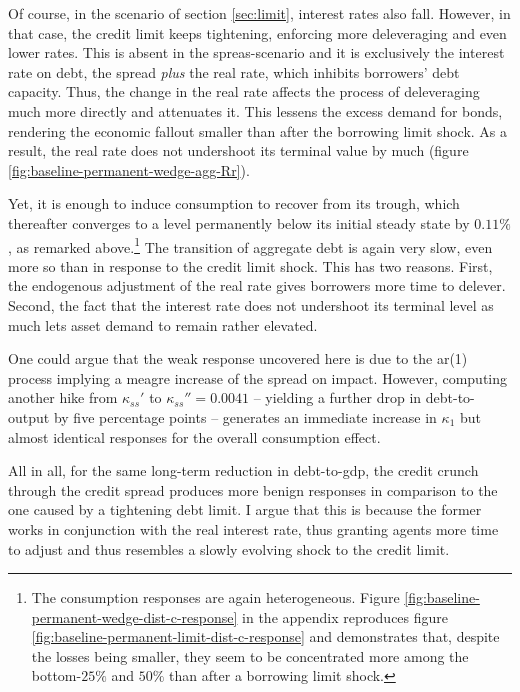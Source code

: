 \documentclass[a4paper,12pt]{article} %
\numberwithin{equation}{section} %
\numberwithin{figure}{section}
\numberwithin{table}{section}
\begin{document}
Of course, in the scenario of section \ref{sec:limit}, interest rates also fall. However, in that case, the credit limit keeps tightening, enforcing more deleveraging and even lower rates. This is absent in the spreas-scenario and it is exclusively the interest rate on debt, the spread \textit{plus} the real rate, which inhibits borrowers' debt capacity. Thus, the change in the real rate affects the process of deleveraging much more directly and attenuates it. This lessens the excess demand for bonds, rendering the economic fallout smaller than after the borrowing limit shock. As a result, the real rate does not undershoot its terminal value by much (figure \ref{fig:baseline-permanent-wedge-agg-Rr}). 

Yet, it is enough to induce consumption to recover from its trough, which thereafter converges to a level permanently below its initial steady state by $0.11\%$, as remarked above.\footnote{The consumption responses are again heterogeneous. Figure \ref{fig:baseline-permanent-wedge-dist-c-response} in the appendix reproduces figure \ref{fig:baseline-permanent-limit-dist-c-response} and demonstrates that, despite the losses being smaller, they seem to be concentrated more among the bottom-$25\%$ and $50\%$ than after a borrowing limit shock.} The transition of aggregate debt is again very slow, even more so than in response to the credit limit shock. This has two reasons. First, the endogenous adjustment of the real rate gives borrowers more time to delever. Second, the fact that the interest rate does not undershoot its terminal level as much lets asset demand to remain rather elevated.

One could argue that the weak response uncovered here is due to the \Gls{ar}(1) process implying a meagre increase of the spread on impact. However, computing another hike from $\kappa_{ss}'$ to $\kappa_{ss}'' = 0.0041$ -- yielding a further drop in debt-to-output by five percentage points -- generates an immediate increase in $\kappa_1$ but almost identical responses for the overall consumption effect.

All in all, for the same long-term reduction in debt-to-\Gls{gdp}, the credit crunch through the credit spread produces more benign responses in comparison to the one caused by a tightening debt limit. I argue that this is because the former works in conjunction with the real interest rate, thus granting agents more time to adjust and thus resembles a slowly evolving shock to the credit limit.

\end{document}
